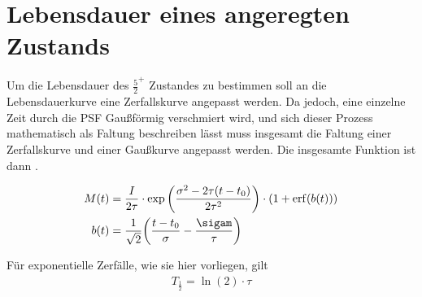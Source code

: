 



\section{Lebensdauer eines angeregten \caesium Zustands}

Um die Lebensdauer des $\frac{5}{2}^+$ \caesium Zustandes zu bestimmen soll an die Lebensdauerkurve eine Zerfallskurve angepasst werden. Da jedoch, eine einzelne Zeit durch die PSF Gaußförmig verschmiert wird, und sich dieser Prozess mathematisch als Faltung beschreiben lässt muss insgesamt die Faltung einer Zerfallskurve und einer Gaußkurve angepasst werden. Die insgesamte Funktion ist dann  \cite[11]{525va}.

\begin{align}
	M(t) &= \frac{I}{2 \tau} \cdot \exp \bigg( \frac{\sigma^2 - 2 \tau (t - t_0)}{2\tau^2}\bigg) \cdot (1 + \erf(b(t))) \\ \label{eq:lifetime_func}
	b(t) &= \frac{1}{\sqrt{2}} \bigg(\frac{t - t_0}{\sigma} - \frac{\sigam}{\tau} \bigg)
\end{align}

Für exponentielle Zerfälle, wie sie hier vorliegen, gilt \cite[11]{leotechniques}
\begin{align}
	T_\frac{1}{2} = \ln(2) \cdot \tau
\end{align}

